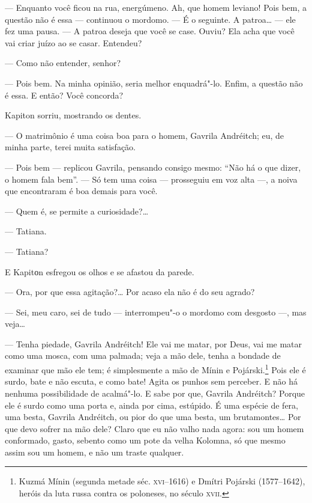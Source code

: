 --- Enquanto você ficou na rua, energúmeno. Ah, que homem leviano! Pois
bem, a questão não é essa --- continuou o mordomo. --- É o seguinte. A
patroa\ldots{} --- ele fez uma pausa. --- A patroa deseja que você se case.
Ouviu? Ela acha que você vai criar juízo ao se casar. Entendeu?

--- Como não entender, senhor?

--- Pois bem. Na minha opinião, seria melhor enquadrá"-lo. Enfim, a
questão não é essa. E então? Você concorda?

Kapiton sorriu, mostrando os dentes.

--- O matrimônio é uma coisa boa para o homem, Gavrila Andréitch; eu, de
minha parte, terei muita satisfação.

--- Pois bem --- replicou Gavrila, pensando consigo mesmo: ``Não há o
que dizer, o homem fala bem''. --- Só tem uma coisa --- prosseguiu em
voz alta ---, a noiva que encontraram é boa demais para você.

--- Quem é, se permite a curiosidade?\ldots{}

--- Tatiana.

--- Tatiana?

E Kapitоn esfregou os olhos e se afastou da parede.

--- Ora, por que essa agitação?\ldots{} Por acaso ela não é do seu agrado?


--- Sei, meu caro, sei de tudo --- interrompeu"-o o mordomo com desgosto
---, mas veja\ldots{}

--- Tenha piedade, Gavrila Andréitch! Ele vai me matar, por Deus, vai me
matar como uma mosca, com uma palmada; veja a mão dele, tenha a bondade
de examinar que mão ele tem; é simplesmente a mão de Mínin e
Pojárski.\footnote{Kuzmá Mínin (segunda metade séc. \textsc{xvi}--1616) e
  Dmítri Pojárski (1577--1642), heróis da luta russa contra os
  poloneses, no século \textsc{xvii}.} Pois ele é surdo, bate e não escuta, e
como bate! Agita os punhos sem perceber. E não há nenhuma possibilidade
de acalmá"-lo. E sabe por que, Gavrila Andréitch? Porque ele é surdo como
uma porta e, ainda por cima, estúpido. É uma espécie de fera, uma besta,
Gavrila Andréitch, ou pior do que uma besta, um brutamontes\ldots{} Por que
devo sofrer na mão dele? Claro que eu não valho nada agora: sou um
homem conformado, gasto, sebento como um pote da velha Kolomna, só que
mesmo assim sou um homem, e não um traste qualquer.

